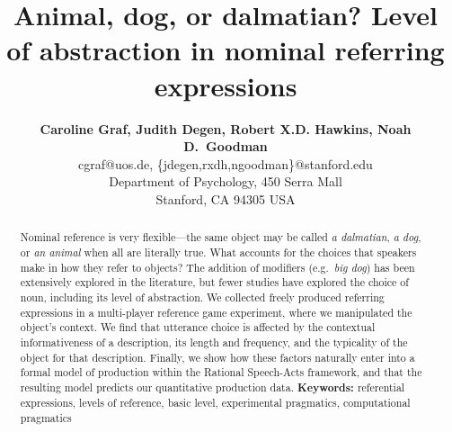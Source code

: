 \documentclass[10pt,letterpaper]{article}
\title{Animal, dog, or dalmatian? Level of abstraction in nominal referring expressions}
\author{{\large \bf Caroline Graf, Judith Degen, Robert X.D. Hawkins, Noah D.~Goodman} \\
  cgraf@uos.de, \{jdegen,rxdh,ngoodman\}@stanford.edu\\
  Department of Psychology, 450 Serra Mall \\
  Stanford, CA 94305 USA}
\newcommand{\red}[1]{\textcolor{Red}{#1}}
\begin{document}
\maketitle


\begin{abstract}


Nominal reference is very flexible---the same object may be called \emph{a dalmatian}, \emph{a dog}, or \emph{an animal} when all are literally true.
What accounts for the choices that speakers make in how they refer to objects?
The addition of modifiers (e.g.~\emph{big dog}) has been extensively explored in the literature, but fewer studies have explored the choice of noun, including its level of abstraction.
We collected freely produced referring expressions in a multi-player reference game experiment, where we manipulated the object's context.
We find that utterance choice is affected by the contextual informativeness of a description, its length and frequency, and the typicality of the object for that description.
Finally, we show how these factors naturally enter into a formal model of production within the Rational Speech-Acts framework, and that the resulting model predicts our quantitative production data.
\textbf{Keywords:} 
referential expressions, levels of reference, basic level, experimental pragmatics, computational pragmatics
\end{abstract}
\end{document}
